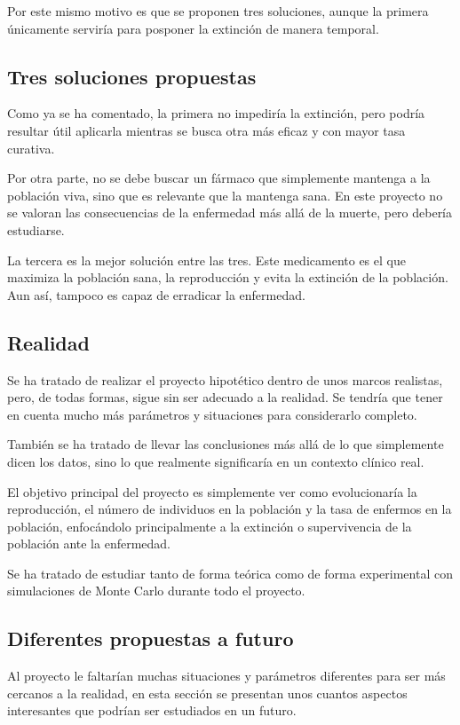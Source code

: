 \documentclass[graybox]{SNmult}
\begin{document}
	Por este mismo motivo es que se proponen tres soluciones, aunque la primera únicamente serviría para posponer la extinción de manera temporal. 
	
	\subsection{Tres soluciones propuestas}
	Como ya se ha comentado, la primera no impediría la extinción, pero podría resultar útil aplicarla mientras se busca otra más eficaz y con mayor tasa curativa. 
	
	Por otra parte, no se debe buscar un fármaco que simplemente mantenga a la población viva, sino que es relevante que la mantenga sana. En este proyecto no se valoran las consecuencias de la enfermedad más allá de la muerte, pero debería estudiarse. 
	
	La tercera es la mejor solución entre las tres. Este medicamento es el que maximiza la población sana, la reproducción y evita la extinción de la población. Aun así, tampoco es capaz de erradicar la enfermedad. 
	
	\subsection{Realidad}
	Se ha tratado de realizar el proyecto hipotético dentro de unos marcos realistas, pero, de todas formas, sigue sin ser adecuado a la realidad. Se tendría que tener en cuenta mucho más parámetros y situaciones para considerarlo completo. 
	
	También se ha tratado de llevar las conclusiones más allá de lo que simplemente dicen los datos, sino lo que realmente significaría en un contexto clínico real. 
	
	El objetivo principal del proyecto es simplemente ver como evolucionaría la reproducción, el número de individuos en la población y la tasa de enfermos en la población, enfocándolo principalmente a la extinción o supervivencia de la población ante la enfermedad. 
	
	Se ha tratado de estudiar tanto de forma teórica como de forma experimental con simulaciones de Monte Carlo durante todo el proyecto. 
	
	\subsection{Diferentes propuestas a futuro}
	Al proyecto le faltarían muchas situaciones y parámetros diferentes para ser más cercanos a la realidad, en esta sección se presentan unos cuantos aspectos interesantes que podrían ser estudiados en un futuro. 
	
\end{document}
